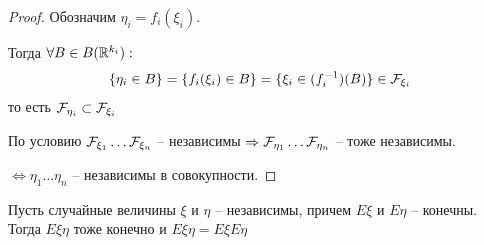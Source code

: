 \begin{proof}
  Обозначим $\eta_i = f_i (\xi_i)$. 

  Тогда $\forall B \in B(\mathbb{R}^{k_i}):$
  \begin{align*}
    \{ \eta_i \in B \} = \{ f_i (\xi_i) \in B \} = \{ \xi_i \in (f_i^{-1}) (B) \} \in \mathcal{F}_{\xi_i}
  \end{align*}
  то есть $\mathcal{F}_{\eta_i} \subset \mathcal{F}_{\xi_i}$

  По условию $\mathcal{F}_{\xi_1} \ldots \mathcal{F}_{\xi_n}$ -- независимы
  $\Rightarrow \mathcal{F}_{\eta_1} \ldots \mathcal{F}_{\eta_n}$ -- тоже независимы.

  $\Leftrightarrow \eta_1 \ldots \eta_n$ -- независимы в совокупности.
\end{proof}

\begin{theorem}
  Пусть случайные величины $\xi$ и $\eta$ -- независимы, причем $E \xi$ и $E \eta$ -- конечны. 
  Тогда $E \xi \eta$ тоже конечно и $E \xi \eta = E \xi E \eta$
\end{theorem}

